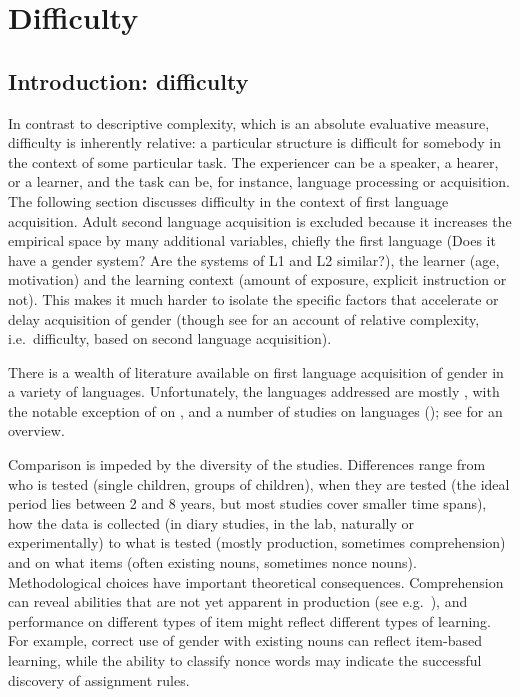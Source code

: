 \documentclass[output=collectionpaper]{langsci/langscibook}
\begin{document}
\section{Difficulty}
\label{sec:Audr:4}

\subsection{Introduction: difficulty}
\label{sec:Audr:4.1}

In contrast to descriptive complexity, which is an absolute evaluative measure, difficulty is inherently relative: a particular structure is difficult for somebody in the context of some particular task. The experiencer can be a speaker, a hearer, or a learner, and the task can be, for instance, language processing or acquisition. The following section discusses difficulty in the context of first language acquisition. Adult second language acquisition is excluded because it increases the empirical space by many additional variables, chiefly the first language (Does it have a gender system? Are the systems of L1 and L2 similar?), the learner (age, motivation) and the learning context (amount of exposure, explicit instruction or not). This makes it much harder to isolate the specific factors that accelerate or delay acquisition of gender (though see \citealt{Kusters2003} for an account of relative complexity, i.e.\ difficulty, based on second language acquisition).

There is a wealth of literature available on first language acquisition of gender in a variety of languages. Unfortunately, the languages addressed are mostly , with the notable exception of \citet{Gagliardi2014} on , and a number of studies on  languages (); see \citet{Demuth2003} for an overview.

Comparison is impeded by the diversity of the studies. Differences range from who is tested (single children, groups of children), when they are tested (the ideal period lies between 2 and 8 years, but most studies cover smaller time spans), how the data is collected (in diary studies, in the lab, naturally or experimentally) to what is tested (mostly production, sometimes comprehension) and on what items (often existing nouns, sometimes nonce nouns). Methodological choices have important theoretical consequences. Comprehension can reveal abilities that are not yet apparent in production (see e.g.\ \citealt{Heugten2010}), and performance on different types of item might reflect different types of learning. For example, correct use of gender with existing nouns can reflect item-based learning, while the ability to classify nonce words may indicate the successful discovery of assignment rules.
\end{document}
